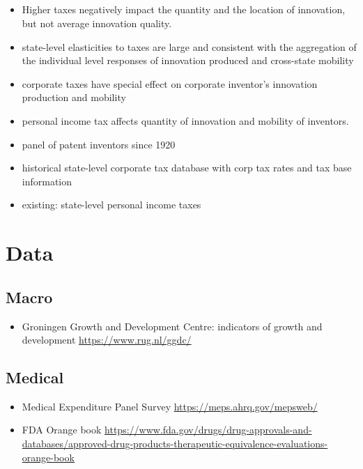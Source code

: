 \documentclass[10pt]{article} %
\begin{document}
     \subsection{\cite{Akcigitetal2018}}
    \begin{itemize}
        \item Higher taxes negatively impact the quantity and the location of innovation, but not average innovation quality.
        \item state-level elasticities to taxes are large and consistent with the aggregation of the individual level responses of innovation produced and cross-state mobility
        \item corporate taxes have special effect on corporate inventor's innovation production and mobility
        \item personal income tax affects quantity of innovation and mobility of inventors.
        \item panel of patent inventors since 1920
        \item historical state-level corporate tax database with corp tax rates and tax base information
        \item existing: state-level personal income taxes
    \end{itemize}

\newpage
\section{Data}
    \subsection{Macro}
        \begin{itemize}
            \item Groningen Growth and Development Centre: indicators of growth and development \url{https://www.rug.nl/ggdc/}
        \end{itemize}

    \subsection{Medical}
        \begin{itemize}
            \item Medical Expenditure Panel Survey \url{https://meps.ahrq.gov/mepsweb/}
            \item FDA Orange book \url{https://www.fda.gov/drugs/drug-approvals-and-databases/approved-drug-products-therapeutic-equivalence-evaluations-orange-book}
        \end{itemize}
\end{document}
